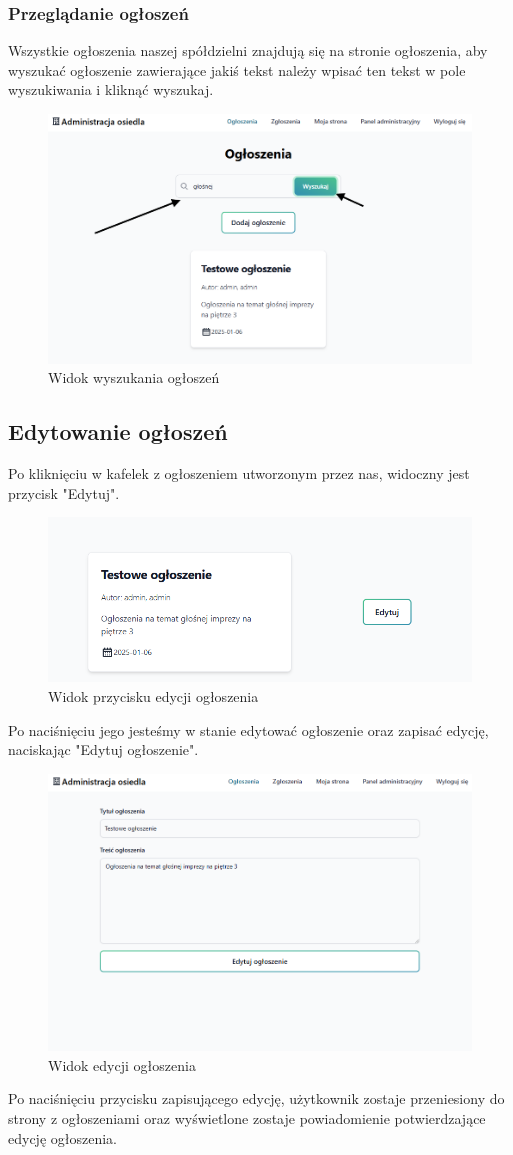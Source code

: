 \subsubsection{Przeglądanie ogłoszeń}
Wszystkie ogłoszenia naszej spółdzielni znajdują się na stronie ogłoszenia, aby wyszukać ogłoszenie zawierające jakiś tekst należy wpisać ten tekst w pole wyszukiwania i kliknąć wyszukaj.
\begin{figure}[H]
    \centering
    \includegraphics[width=0.75\linewidth]{img/search_posts.png}
    \caption{Widok wyszukania ogłoszeń}
    \label{fig:post-search}
\end{figure}
\subsection{Edytowanie ogłoszeń}
Po kliknięciu w kafelek z ogłoszeniem utworzonym przez nas, widoczny jest przycisk "Edytuj".
\begin{figure}[H]
    \centering
    \includegraphics[width=0.75\linewidth]{img/edit_post_button.png}
    \caption{Widok przycisku edycji ogłoszenia}
    \label{fig:edit-post}
\end{figure}
Po naciśnięciu jego jesteśmy w stanie edytować ogłoszenie oraz zapisać edycję, naciskając "Edytuj ogłoszenie".
\begin{figure}[H]
    \centering
    \includegraphics[width=0.75\linewidth]{img/post_edit.png}
    \caption{Widok edycji ogłoszenia}
    \label{fig:edit_post}
\end{figure}
Po naciśnięciu przycisku zapisującego edycję, użytkownik zostaje przeniesiony do strony z ogłoszeniami oraz wyświetlone zostaje powiadomienie potwierdzające edycję ogłoszenia.
